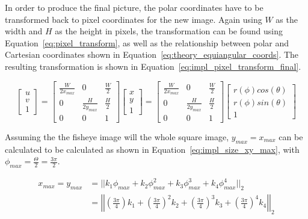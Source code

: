 In order to produce the final picture, the polar coordinates have to be transformed back to pixel coordinates for the new image. Again using $W$ as the width and $H$ as the height in pixels, the transformation can be found using Equation~\eqref{eq:pixel_transform}, as well as the relationship between polar and Cartesian coordinates shown in Equation~\eqref{eq:theory_equiangular_coords}. The resulting transformation is shown in Equation~\eqref{eq:impl_pixel_transform_final}.

\begin{equation}
    \begin{bmatrix}
        u \\ v \\ 1
    \end{bmatrix} = \begin{bmatrix}
        \frac{W}{2x_{max}} & 0 & \frac{W}{2} \\
        0 & \frac{H}{2y_{max}} & \frac{H}{2} \\
        0 & 0 & 1
    \end{bmatrix}\begin{bmatrix}
        x \\ y \\ 1
    \end{bmatrix} =
    \begin{bmatrix}
        \frac{W}{2x_{max}} & 0 & \frac{W}{2} \\
        0 & \frac{H}{2y_{max}} & \frac{H}{2} \\
        0 & 0 & 1
    \end{bmatrix}\begin{bmatrix}
        r(\phi) cos(\theta) \\ r(\phi) sin(\theta) \\ 1
    \end{bmatrix}
    \label{eq:impl_pixel_transform_final}
\end{equation}

Assuming the the fisheye image will the whole square image, $y_{max} = x_{max}$ can be calculated to be calculated as shown in Equation~\eqref{eq:impl_size_xy_max}, with $\phi_{max}=\frac{\Theta}{2}=\frac{3 \pi}{2}$.

\begin{equation}
    \begin{aligned}
        x_{max} = y_{max} &= ||k_1 \phi_{max} + k_2 \phi_{max}^2 + k_3 \phi_{max}^3 + k_4 \phi_{max}^4 ||_2 \\
        &= \left|\left| \left(\frac{3 \pi}{4}\right)k_1 + \left(\frac{3 \pi}{4}\right)^2 k_2 + \left(\frac{3 \pi}{4}\right)^3 k_3 + \left(\frac{3 \pi}{4}\right)^4 k_4 \right|\right|_2
    \end{aligned}
    \label{eq:impl_size_xy_max}
\end{equation}

